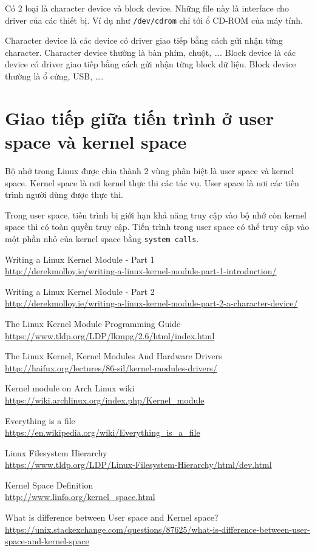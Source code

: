 \documentclass[12pt]{article}
\begin{document}
Có 2 loại là character device và block device. Những file này là interface cho driver của các thiết bị. Ví dụ như \texttt{/dev/cdrom} chỉ tới ổ CD-ROM của máy tính.

Character device là các device có driver giao tiếp bằng cách gửi nhận từng character. Character device thường là bàn phím, chuột, \dots . Block device là các device có driver giao tiếp bằng cách gửi nhận từng block dữ liệu. Block device thường là ổ cứng, USB, \dots .

\section{Giao tiếp giữa tiến trình ở user space và kernel space}

Bộ nhớ trong Linux được chia thành 2 vùng phân biệt là user space và kernel space. Kernel space là nơi kernel thực thi các tác vụ. User space là nơi các tiến trình người dùng được thực thi.

Trong user space, tiến trình bị giới hạn khả năng truy cập vào bộ nhớ còn kernel space thì có toàn quyền truy cập.  Tiến trình trong user space  có thể truy cập vào một phần nhỏ của kernel space bằng \texttt{system calls}.

\begin{thebibliography}{1}

 Writing a Linux Kernel Module - Part 1 \\
\url{http://derekmolloy.ie/writing-a-linux-kernel-module-part-1-introduction/}

  Writing a Linux Kernel Module - Part 2 \\
\url{http://derekmolloy.ie/writing-a-linux-kernel-module-part-2-a-character-device/}

 The Linux Kernel Module Programming Guide \\
\url{https://www.tldp.org/LDP/lkmpg/2.6/html/index.html}

 The Linux Kernel, Kernel Modules And Hardware Drivers \\
\url{http://haifux.org/lectures/86-sil/kernel-modules-drivers/}

 Kernel module on Arch Linux wiki \\
\url{https://wiki.archlinux.org/index.php/Kernel_module}

 Everything is a file \\
\url{https://en.wikipedia.org/wiki/Everything_is_a_file}

 Linux Filesystem Hierarchy \\
\url{https://www.tldp.org/LDP/Linux-Filesystem-Hierarchy/html/dev.html}

 Kernel Space Definition \\
\url{http://www.linfo.org/kernel_space.html}

 What is difference between User space and Kernel space? \\
\url{https://unix.stackexchange.com/questions/87625/what-is-difference-between-user-space-and-kernel-space}

\end{thebibliography}
\end{document}
